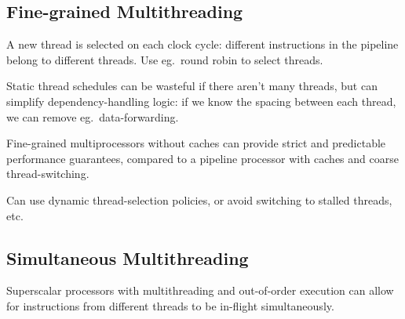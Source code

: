 \documentclass[11pt]{article}
\begin{document}
{    \subsection*{Fine-grained Multithreading}
    {
        A new thread is selected on each clock cycle: different instructions in the pipeline belong to different threads. Use eg.\ round robin to select threads.

        Static thread schedules can be wasteful if there aren't many threads, but can simplify dependency-handling logic: if we know the spacing between each thread, we can remove eg.\ data-forwarding.

        Fine-grained multiprocessors without caches can provide strict and predictable performance guarantees, compared to a pipeline processor with caches and coarse thread-switching.

        Can use dynamic thread-selection policies, or avoid switching to stalled threads, etc.
    }
    \subsection*{Simultaneous Multithreading}
    {
        Superscalar processors with multithreading and out-of-order execution can allow for instructions from different threads to be in-flight simultaneously.
    }
}
\end{document}
